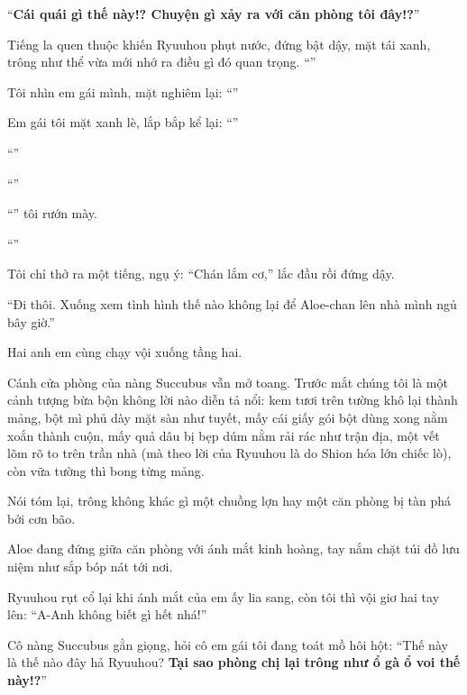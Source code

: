 \documentclass[../main.tex]{subfiles}
\begin{document}
``\textbf{Cái quái gì thế này!? Chuyện gì xảy ra với căn phòng tôi đây!?}''

Tiếng la quen thuộc khiến Ryuuhou phụt nước, đứng bật dậy, mặt tái xanh, trông như thể vừa mới nhớ ra điều gì đó quan trọng. ``''

Tôi nhìn em gái mình, mặt nghiêm lại: ``''

Em gái tôi mặt xanh lè, lắp bắp kể lại: ``''

``''

``''

``'' tôi rướn mày.

``''

Tôi chỉ thở ra một tiếng, ngụ ý: ``Chán lắm cơ,'' lắc đầu rồi đứng dậy.

``Đi thôi. Xuống xem tình hình thế nào không lại để Aloe-chan lên nhà mình ngủ bây giờ.''

Hai anh em cùng chạy vội xuống tầng hai.

Cánh cửa phòng của nàng Succubus vẫn mở toang. Trước mắt chúng tôi là một cảnh tượng bừa bộn không lời nào diễn tả nổi: kem tươi trên tường khô lại thành mảng, bột mì phủ dày mặt sàn như tuyết, mấy cái giấy gói bột dùng xong nằm xoắn thành cuộn, mấy quả dâu bị bẹp dúm nằm rải rác như trận địa, một vết lõm rõ to trên trần nhà (mà theo lời của Ryuuhou là do Shion hóa lớn chiếc lò), còn vữa tường thì bong từng mảng.

Nói tóm lại, trông không khác gì một chuồng lợn hay một căn phòng bị tàn phá bởi cơn bão.

Aloe đang đứng giữa căn phòng với ánh mắt kinh hoàng, tay nắm chặt túi đồ lưu niệm như sắp bóp nát tới nơi.

Ryuuhou rụt cổ lại khi ánh mắt của em ấy lia sang, còn tôi thì vội giơ hai tay lên: ``A-Anh không biết gì hết nhá!''

Cô nàng Succubus gằn giọng, hỏi cô em gái tôi đang toát mồ hôi hột: ``Thế này là thế nào đây hả Ryuuhou? \textbf{Tại sao phòng chị lại trông như ổ gà ổ voi thế này!?}''
\end{document}
